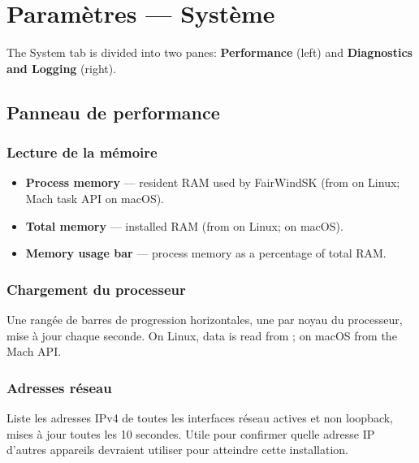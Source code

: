 \chapter{Paramètres --- Système}
\label{ch:settings-system}

The System tab is divided into two panes: \textbf{Performance} (left) and
\textbf{Diagnostics and Logging} (right).


\section{Panneau de performance}

\subsection{Lecture de la mémoire}

\begin{itemize}
  \item \textbf{Process memory} --- resident RAM used by FairWindSK
        (from  on Linux; Mach task API on macOS).
  \item \textbf{Total memory} --- installed RAM
        (from  on Linux;  on macOS).
  \item \textbf{Memory usage bar} --- process memory as a percentage of total RAM.
\end{itemize}

\subsection{Chargement du processeur}

Une rangée de barres de progression horizontales, une par noyau du processeur, mise à jour chaque seconde.
On Linux, data is read from ;
on macOS from the Mach  API.

\subsection{Adresses réseau}

Liste les adresses IPv4 de toutes les interfaces réseau actives et non loopback, mises à jour toutes les 10 secondes.
Utile pour confirmer quelle adresse IP d'autres appareils devraient utiliser pour atteindre cette installation.

